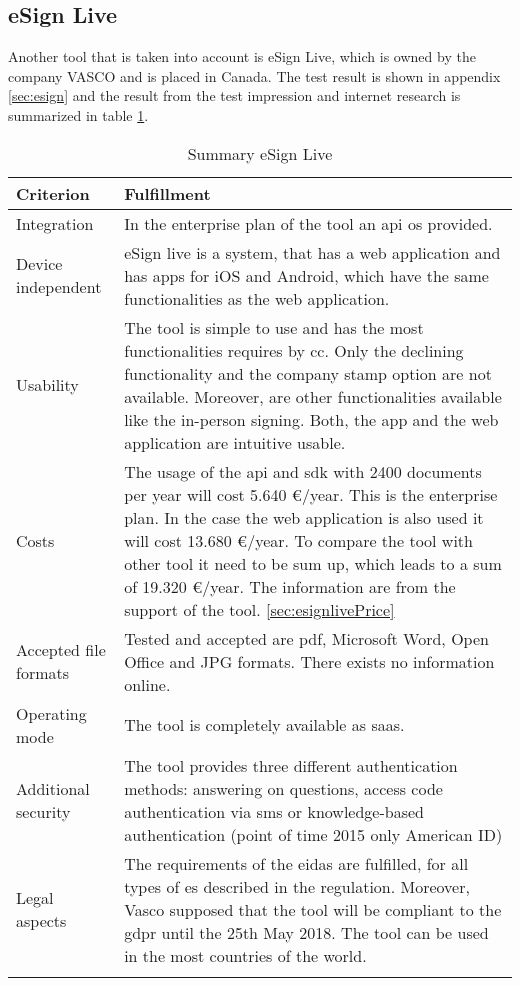 \subsection{eSign Live}
Another tool that is taken into account is eSign Live, which is owned by the company VASCO and is placed in Canada. The test result is shown in appendix \ref{sec:esign} and the result from the test impression and internet research is summarized in table \ref{tab:esign}.
	\begin{longtable}{|p{4cm}|p{10cm}|} \hline
		Criterion & Fulfillment \\ \hline
		Integration & In the enterprise plan of the tool an \gls{api} os provided. \parencite{esign2018info} \\ \hline
		Device independent & eSign live is a system, that has a web application and has \glspl{app} for iOS and Android, which have the same functionalities as the web application. \parencite{esign2018info} \\ \hline
		Usability & The tool is simple to use and has the most functionalities requires by \gls{cc}. Only the declining functionality and the company stamp option are not available. Moreover, are other functionalities available like the in-person signing. Both, the \gls{app} and the web application are intuitive usable.  \\ \hline
		Costs & The usage of the \gls{api} and \gls{sdk} with 2400 documents per year will cost 5.640 \euro/year. This is the enterprise plan. In the case the web application is also used it will cost 13.680 \euro/year. To compare the tool with other tool it need to be sum up, which leads to a sum of 19.320 \euro/year. The information are from the support of the tool. \ref{sec:esignlivePrice} \\ \hline
		Accepted file formats & Tested and accepted are \gls{pdf}, Microsoft Word, Open Office and JPG formats. There exists no information online.\\ \hline
		Operating mode & The tool is completely available as \gls{saas}.\\ \hline
		Additional security & The tool provides three different authentication methods: answering on questions, access code authentication via \gls{sms} or knowledge-based authentication (point of time 2015 only American ID) \parencite{esign2018security} \\ \hline
		Legal aspects & The requirements of the \gls{eidas} are fulfilled, for all types of \gls{es} described in the regulation. Moreover, Vasco supposed that the tool will be compliant to the \gls{gdpr} until the 25th May 2018. The tool can be used in the most countries of the world. \parencite{esign2018eidas,esign2018legal} \\ \hline
	\caption{Summary eSign Live}
	\label{tab:esign}
	\end{longtable}

